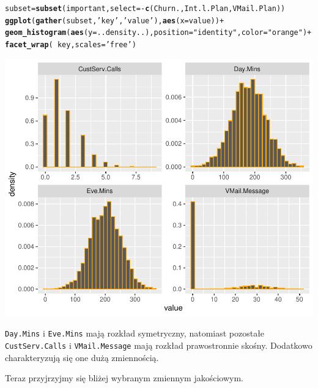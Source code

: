 \documentclass{article}\usepackage[]{graphicx}\usepackage[]{color}
\makeatletter
\def\maxwidth{ %
  \ifdim\Gin@nat@width>\linewidth
    \linewidth
  \else
    \Gin@nat@width
  \fi
}
\newcommand{\hlstr}[1]{\textcolor[rgb]{0.192,0.494,0.8}{#1}}%
\newcommand{\hlopt}[1]{\textcolor[rgb]{0,0,0}{#1}}%
\newcommand{\hlstd}[1]{\textcolor[rgb]{0.345,0.345,0.345}{#1}}%
\newcommand{\hlkwb}[1]{\textcolor[rgb]{0.69,0.353,0.396}{#1}}%
\newcommand{\hlkwc}[1]{\textcolor[rgb]{0.333,0.667,0.333}{#1}}%
\newcommand{\hlkwd}[1]{\textcolor[rgb]{0.737,0.353,0.396}{\textbf{#1}}}%
\newenvironment{kframe}{%
 \def\at@end@of@kframe{}%
 \ifinner\ifhmode%
  \def\at@end@of@kframe{\end{minipage}}%
  \begin{minipage}{\columnwidth}%
 \fi\fi%
 \def\FrameCommand##1{\hskip\@totalleftmargin \hskip-\fboxsep
 \colorbox{shadecolor}{##1}\hskip-\fboxsep
     \hskip-\linewidth \hskip-\@totalleftmargin \hskip\columnwidth}%
 \MakeFramed {\advance\hsize-\width
   \@totalleftmargin\z@ \linewidth\hsize
   \@setminipage}}%
 {\par\unskip\endMakeFramed%
 \at@end@of@kframe}
\newenvironment{knitrout}{}{} %
\makeatother
\begin{document}
\begin{knitrout}
\color{fgcolor}\begin{kframe}
\begin{alltt}
\hlstd{subset} \hlkwb{=} \hlkwd{subset}\hlstd{(important,} \hlkwc{select}\hlstd{=}\hlopt{-}\hlkwd{c}\hlstd{(Churn., Int.l.Plan, VMail.Plan))}
\hlkwd{ggplot}\hlstd{(}\hlkwd{gather}\hlstd{(subset,} \hlstr{'key'}\hlstd{,} \hlstr{'value'}\hlstd{),} \hlkwd{aes}\hlstd{(}\hlkwc{x}\hlstd{=value))} \hlopt{+}
  \hlkwd{geom_histogram}\hlstd{(}\hlkwd{aes}\hlstd{(}\hlkwc{y}\hlstd{=..density..),} \hlkwc{position}\hlstd{=}\hlstr{"identity"}\hlstd{,} \hlkwc{color}\hlstd{=}\hlstr{"orange"}\hlstd{)} \hlopt{+}
  \hlkwd{facet_wrap}\hlstd{(}\hlopt{~}\hlstd{key,} \hlkwc{scales}\hlstd{=}\hlstr{'free'}\hlstd{)}
\end{alltt}
\end{kframe}

{\centering \includegraphics[width=\maxwidth]{figure/histograms-1} 

}



\end{knitrout}


\verb|Day.Mins| i \verb|Eve.Mins| mają rozkład symetryczny, natomiast pozostałe \verb|CustServ.Calls| i \verb|VMail.Message| mają rozkład prawostronnie skośny. Dodatkowo charakteryzują się one dużą zmiennością.

Teraz przyjrzyjmy się bliżej wybranym zmiennym jakościowym.
\end{document}
